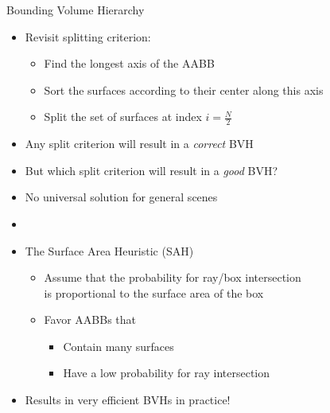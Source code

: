\documentclass[utf8,stillsansserifmath,fleqn,t]{beamer}
\begin{document}
\begin{frame}[label=sah]
\frametitle{\insertsection}
Bounding Volume Hierarchy
\begin{itemize}
\item Revisit splitting criterion:
    \begin{itemize}
    \item Find the longest axis of the AABB
    \item Sort the surfaces according to their center along this axis
    \item Split the set of surfaces at index $i = \frac{N}{2}$
    \end{itemize}
\item Any split criterion will result in a \emph{correct} BVH
\item But which split criterion will result in a \emph{good} BVH?
\item No universal solution for general scenes
\item[~]
\item The Surface Area Heuristic (SAH)
    \begin{itemize}
    \item Assume that the probability for ray/box intersection\\
        is proportional to the surface area of the box
    \item Favor AABBs that
        \begin{itemize}
        \item Contain many surfaces
        \item Have a low probability for ray intersection
        \end{itemize}
    \end{itemize}
\item Results in very efficient BVHs in practice!
\end{itemize}
\end{frame}
\end{document}
